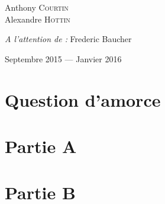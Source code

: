 \documentclass[12pt, openany]{report}
\begin{document}
\begin{titlepage}
\begin{sffamily}
\begin{center}
    \begin{minipage}{0.4\textwidth}
      \begin{flushleft} \large
        Anthony \textsc{Courtin}\\
        Alexandre \textsc{Hottin}\\
      \end{flushleft}
    \end{minipage}
    \begin{minipage}{0.4\textwidth}
      \begin{flushright} \large
        \emph{A l'attention de :} Frederic Baucher \\
      \end{flushright}
    \end{minipage}

    \vfill

    {\large Septembre 2015 — Janvier 2016}

  \end{center}
  \end{sffamily}
\end{titlepage}

\tableofcontents{}
\newpage

\chapter{Question d'amorce}


\chapter{Partie A}


\chapter{Partie B}


% 

% 

% 

% 

\listoffigures
\end{document}
